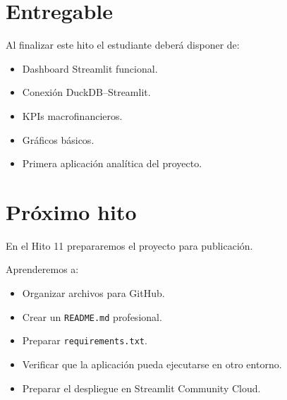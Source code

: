 \section{Entregable}

Al finalizar este hito el estudiante deberá disponer de:

\begin{itemize}
\item Dashboard Streamlit funcional.
\item Conexión DuckDB--Streamlit.
\item KPIs macrofinancieros.
\item Gráficos básicos.
\item Primera aplicación analítica del proyecto.
\end{itemize}

\section{Próximo hito}

En el Hito 11 prepararemos el proyecto para publicación.

Aprenderemos a:

\begin{itemize}
\item Organizar archivos para GitHub.
\item Crear un \texttt{README.md} profesional.
\item Preparar \texttt{requirements.txt}.
\item Verificar que la aplicación pueda ejecutarse en otro entorno.
\item Preparar el despliegue en Streamlit Community Cloud.
\end{itemize}
